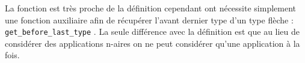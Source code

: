 \begin{defn}
La fonction est très proche de la définition cependant ont nécessite simplement une
fonction auxiliaire afin de récupérer l'avant dernier type d'un type flèche :
\verb|get_before_last_type| . La seule différence avec la définition est que au lieu de 
considérer des applications n-aires on ne peut considérer qu'une application à la fois.


\end{defn}